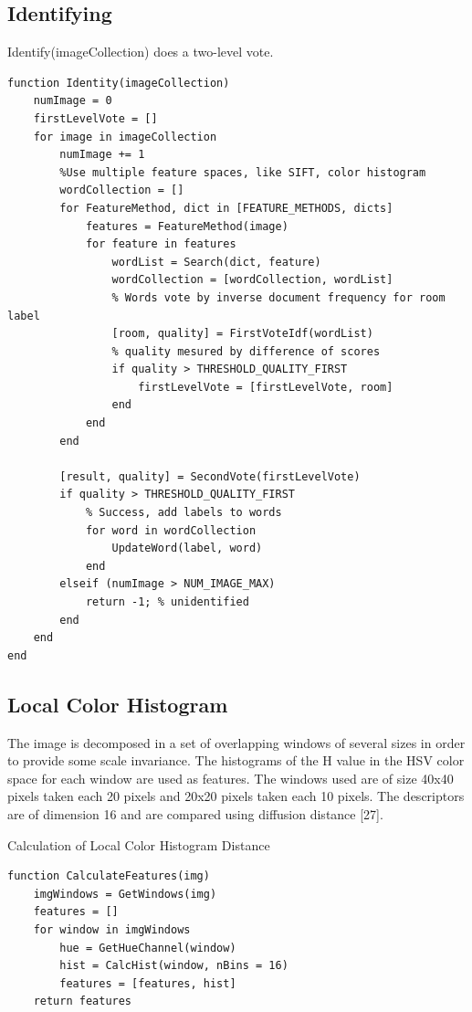 \documentclass[a4paper]{scrartcl}
\begin{document}
\subsection{Identifying}
\begin{listing}[H]
\caption{Identify(imageCollection) does a two-level vote. }
\begin{verbatim}
function Identity(imageCollection)
	numImage = 0
	firstLevelVote = []
	for image in imageCollection   	
    	numImage += 1
        %Use multiple feature spaces, like SIFT, color histogram
        wordCollection = []
        for FeatureMethod, dict in [FEATURE_METHODS, dicts]
            features = FeatureMethod(image)
            for feature in features
                wordList = Search(dict, feature)
                wordCollection = [wordCollection, wordList]
                % Words vote by inverse document frequency for room label
                [room, quality] = FirstVoteIdf(wordList)
                % quality mesured by difference of scores
                if quality > THRESHOLD_QUALITY_FIRST
                    firstLevelVote = [firstLevelVote, room]
                end
            end
        end 
        
        [result, quality] = SecondVote(firstLevelVote)
        if quality > THRESHOLD_QUALITY_FIRST 
         	% Success, add labels to words 
            for word in wordCollection
            	UpdateWord(label, word)
            end
        elseif (numImage > NUM_IMAGE_MAX)
        	return -1; % unidentified
        end        
  	end
end
\end{verbatim}
\end{listing}

\subsection{Local Color Histogram}
The image is decomposed in a
set of overlapping windows of several sizes in order to
provide some scale invariance. The histograms of the
H value in the HSV color space for each window are
used as features. The windows used are of size 40x40
pixels taken each 20 pixels and 20x20 pixels taken each
10 pixels. The descriptors are of dimension 16 and are
compared using diffusion distance [27].
\begin{listing}[H]
\caption{Calculation of Local Color Histogram Distance}
\begin{verbatim}
function CalculateFeatures(img)
	imgWindows = GetWindows(img)
    features = []
    for window in imgWindows
    	hue = GetHueChannel(window)
        hist = CalcHist(window, nBins = 16)
        features = [features, hist]
    return features
\end{verbatim}
\end{listing}
\end{document}
